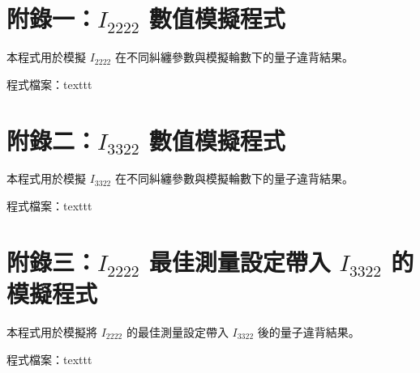 \documentclass[12pt, a4paper, twoside, reqno]{article}
\renewcommand{\baselinestretch}{1.4}
\begin{document}
\clearpage
\renewcommand{\baselinestretch}{1}
{\small

}



\clearpage
\appendix

\section*{附錄一：$I_{2222}$ 數值模擬程式}
本程式用於模擬 $I_{2222}$ 在不同糾纏參數與模擬輪數下的量子違背結果。
\par
程式檔案：\csname texttt

\bigskip
\section*{附錄二：$I_{3322}$ 數值模擬程式}
本程式用於模擬 $I_{3322}$ 在不同糾纏參數與模擬輪數下的量子違背結果。
\par
程式檔案：\csname texttt

\bigskip
\section*{附錄三：$I_{2222}$ 最佳測量設定帶入 $I_{3322}$ 的模擬程式}
本程式用於模擬將 $I_{2222}$ 的最佳測量設定帶入 $I_{3322}$ 後的量子違背結果。
\par
程式檔案：\csname texttt
\end{document}
